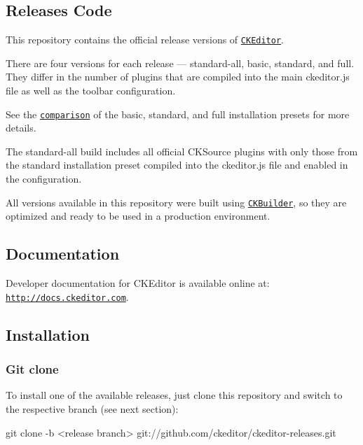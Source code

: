 \subsection*{Releases Code}

This repository contains the official release versions of \href{http://ckeditor.com}{\tt C\+K\+Editor}.

There are four versions for each release --- {\ttfamily standard-\/all}, {\ttfamily basic}, {\ttfamily standard}, and {\ttfamily full}. They differ in the number of plugins that are compiled into the main {\ttfamily ckeditor.\+js} file as well as the toolbar configuration.

See the \href{http://ckeditor.com/presets}{\tt comparison} of the {\ttfamily basic}, {\ttfamily standard}, and {\ttfamily full} installation presets for more details.

The {\ttfamily standard-\/all} build includes all official C\+K\+Source plugins with only those from the {\ttfamily standard} installation preset compiled into the {\ttfamily ckeditor.\+js} file and enabled in the configuration.

All versions available in this repository were built using \href{http://ckeditor.com/builder}{\tt C\+K\+Builder}, so they are optimized and ready to be used in a production environment.

\subsection*{Documentation}

Developer documentation for C\+K\+Editor is available online at\+: \href{http://docs.ckeditor.com}{\tt http\+://docs.\+ckeditor.\+com}.

\subsection*{Installation}

\subsubsection*{Git clone}

To install one of the available releases, just clone this repository and switch to the respective branch (see next section)\+: \begin{DoxyVerb}git clone -b <release branch> git://github.com/ckeditor/ckeditor-releases.git
\end{DoxyVerb}


